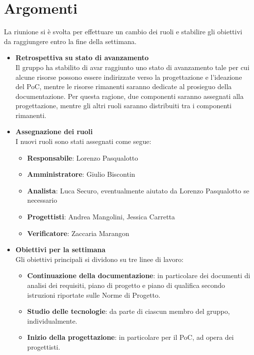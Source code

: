 \section{Argomenti} \label{sec:argomenti}
La riunione si è svolta per effettuare un cambio dei ruoli e stabilire gli obiettivi da raggiungere entro la fine della settimana.
    \begin{itemize}
        \item \textbf{Retrospettiva su stato di avanzamento} \\
        Il gruppo ha stabilito di avar raggiunto uno stato di avanzamento tale per cui alcune risorse possono essere indirizzate verso la progettazione e l'ideazione del PoC, mentre le risorse rimanenti saranno dedicate al prosieguo della documentazione. Per questa ragione, due componenti saranno assegnati alla progettazione, mentre gli altri ruoli saranno distribuiti tra i componenti rimanenti.
        \item \textbf{Assegnazione dei ruoli} \\
        I nuovi ruoli sono stati assegnati come segue:
        \begin{itemize}
            \item \textbf{Responsabile}: Lorenzo Pasqualotto
            \item \textbf{Amministratore}: Giulio Biscontin
            \item \textbf{Analista}: Luca Securo, eventualmente aiutato da Lorenzo Pasqualotto se necessario
            \item \textbf{Progettisti}: Andrea Mangolini, Jessica Carretta
            \item \textbf{Verificatore}: Zaccaria Marangon
        \end{itemize}
        \item \textbf{Obiettivi per la settimana}\\
        Gli obiettivi principali si dividono su tre linee di lavoro:
        \begin{itemize}
            \item \textbf{Continuazione della documentazione}: in particolare dei documenti di analisi dei requisiti, piano di progetto e piano di qualifica secondo istruzioni riportate sulle Norme di Progetto.
            \item \textbf{Studio delle tecnologie}: da parte di ciascun membro del gruppo, individualmente.
            \item \textbf{Inizio della progettazione}: in particolare per il PoC, ad opera dei progettisti.

\end{itemize}
\end{itemize}
